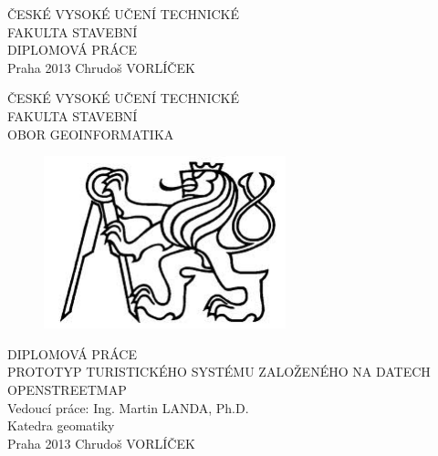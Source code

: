 \documentclass[11pt,a4paper,titlepage,oneside]{book}
\begin{document}
\rhead{\leftmark}
\cfoot{\thepage}
\setlength{\headheight}{24pt}

\pagestyle{empty}	%

\begin{titlepage} %
	\begin{center}
		{\huge ČESKÉ VYSOKÉ UČENÍ TECHNICKÉ} \\ [0.25cm]
		{\LARGE FAKULTA STAVEBNÍ}
		\\[9cm]		
		{\Huge DIPLOMOVÁ PRÁCE}
		\\[9cm]
		{\Large Praha 2013  Chrudoš VORLÍČEK}
	\end{center}
\end{titlepage}

\begin{titlepage} %
	\begin{center}
		{\huge ČESKÉ VYSOKÉ UČENÍ TECHNICKÉ} \\
		{\LARGE FAKULTA STAVEBNÍ \\ [0.25cm]OBOR GEOINFORMATIKA}
		\\[1cm]
		\begin{figure}[!h]
		\begin{center}
		\includegraphics[height=5cm]{obrazky/lev.jpg}
		\\[1cm]
		\end{center}
		\end{figure}							
		{\Huge DIPLOMOVÁ PRÁCE \\ [0.25cm]}
		{\LARGE \uppercase {Prototyp turistického systému zaloŽeného na datech OpenStreetMap}}
		\\[3.5cm]
		{\Large Vedoucí práce: Ing. Martin LANDA, Ph.D. \\[0.25cm] Katedra geomatiky}
		\\[1cm]
		{\Large Praha 2013  Chrudoš VORLÍČEK}
	\end{center}
\end{titlepage}
\end{document}
